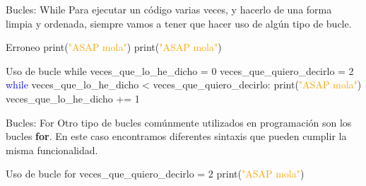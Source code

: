 \documentclass{beamer}
\begin{document}
\begin{frame}{Bucles: While}
Para ejecutar un código varias veces, y hacerlo de una forma limpia y ordenada, siempre vamos a tener que hacer uso de algún tipo de bucle.
\begin{Programexample}{Erroneo}
print(\textcolor{orange}{"ASAP mola"}) \newline
print(\textcolor{orange}{"ASAP mola"})
\end{Programexample}
\begin{Programexample}{Uso de bucle while}
veces\_que\_lo\_he\_dicho = 0 \newline
veces\_que\_quiero\_decirlo = 2 \newline
\textcolor{blue}{while} veces\_que\_lo\_he\_dicho < veces\_que\_quiero\_decirlo: \newline
\hspace*{1cm} print(\textcolor{orange}{"ASAP mola"}) \newline
\hspace*{1cm} veces\_que\_lo\_he\_dicho += 1 %
\end{Programexample}
\end{frame}

\begin{frame}{Bucles: For}
Otro tipo de bucles comúnmente utilizados en programación son los bucles \textbf{for}. En este caso encontramos diferentes sintaxis que pueden cumplir la misma funcionalidad.
\begin{Programexample}{Uso de bucle for}
veces\_que\_quiero\_decirlo = 2 \newline
{} \newline
\hspace*{1cm} print(\textcolor{orange}{"ASAP mola"})
\end{Programexample}
\end{frame}
\end{document}
